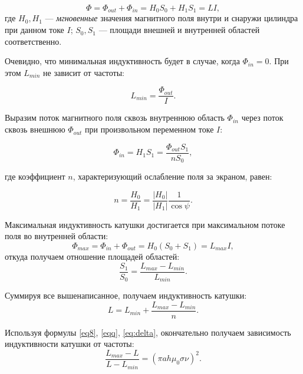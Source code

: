 \documentclass[a4paper,12pt]{article}
\theoremstyle{plain} %
\theoremstyle{definition} %
\theoremstyle{remark} %
\begin{document}
\begin{equation}
	\Phi = \Phi_{out} + \Phi_{in} = H_0S_0 + H_1S_1 = LI,
\end{equation}
где $H_0, H_1$ --- \textit{мгновенные} значения магнитного поля внутри и снаружи цилиндра при данном токе $I$; $S_0, S_1$ --- площади внешней и внутренней областей соответственно.

Очевидно, что минимальная индуктивность будет в случае, когда $\Phi_{in} = 0$. При этом $L_{min}$ не зависит от частоты:

\begin{equation}
	L_{min} = \frac{\Phi_{out}}{I}.
\end{equation}
	
	Выразим поток магнитного поля сквозь внутреннюю область $\Phi_{in}$ через поток сквозь внешнюю $\Phi_{out}$ при произвольном переменном токе $I$:
	
	\begin{equation}
		\Phi_{in} = H_1S_1 = \frac{\Phi_{out} S_1}{nS_0},
	\end{equation}
	
	где коэффициент $n$, характеризующий ослабление поля за экраном, равен:
	
	\begin{equation}
		n = \frac{H_0}{H_1} = \frac{|H_0|}{|H_1|} \frac{1}{\cos \psi}.
	\end{equation}
	
	Максимальная индуктивность катушки достигается при максимальном потоке поля во внутренней области:
	\begin{equation}
		\Phi_{max} = \Phi_{in} + \Phi_{out} = H_0(S_0 +S_1) = L_{max}I,
	\end{equation}
	откуда получаем отношение площадей областей:
	\begin{equation}
		\frac{S_1}{S_0} = \frac{L_{max} - L_{min}}{L_{min}}.
	\end{equation}
	
	Суммируя все вышенаписанное, получаем индуктивность катушки:
	\begin{equation}
		L =L_{min} + \frac{L_{max} - L_{min}}{n}.
	\end{equation}
	
	Используя формулы \eqref{eq8}, \eqref{eqq}, \eqref{eq:delta}, окончательно получаем зависимость индуктивности катушки от частоты:
	\begin{equation} \label{eql}
		 \frac{L_{max} - L}{L- L_{min}} = (\pi ah\mu_0 \sigma \nu)^2.
	\end{equation}
	
\end{document}
